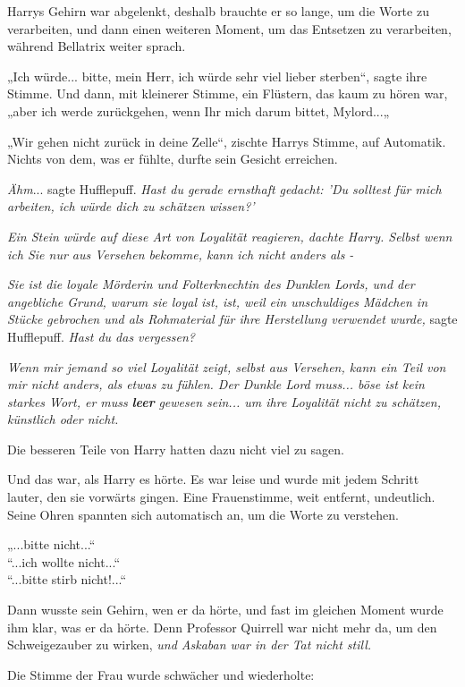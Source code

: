 {Harrys Gehirn war abgelenkt, deshalb brauchte er so lange, um die Worte zu verarbeiten, und dann einen weiteren Moment, um das Entsetzen zu verarbeiten, während Bellatrix weiter sprach.

„Ich würde... bitte, mein Herr, ich würde sehr viel lieber sterben“, sagte ihre Stimme. Und dann, mit kleinerer Stimme, ein Flüstern, das kaum zu hören war,\\ „aber ich werde zurückgehen, wenn Ihr mich darum bittet, Mylord...„

„Wir gehen nicht zurück in deine Zelle“, zischte Harrys Stimme, auf Automatik. Nichts von dem, was er fühlte, durfte sein Gesicht erreichen.

\emph{Ähm}... sagte Hufflepuff. \emph{Hast du gerade ernsthaft gedacht: 'Du solltest für mich arbeiten, ich würde dich zu schätzen wissen?'}

\emph{Ein Stein würde auf diese Art von Loyalität reagieren, dachte Harry. Selbst wenn ich Sie nur aus Versehen bekomme, kann ich nicht anders als -}

\emph{Sie ist die loyale Mörderin und Folterknechtin des Dunklen Lords, und der angebliche Grund, warum sie loyal ist, ist, weil ein unschuldiges Mädchen in Stücke gebrochen und als Rohmaterial für ihre Herstellung verwendet wurde,} sagte Hufflepuff. \emph{Hast du das vergessen?}

\emph{Wenn mir jemand so viel Loyalität zeigt, selbst aus Versehen, kann ein Teil von mir nicht anders, als etwas zu fühlen. Der Dunkle Lord muss... böse ist kein starkes Wort, er muss} \textbf{\emph{leer}} \emph{gewesen sein... um ihre Loyalität nicht zu schätzen, künstlich oder nicht.}

Die besseren Teile von Harry hatten dazu nicht viel zu sagen.

Und das war, als Harry es hörte. Es war leise und wurde mit jedem Schritt lauter, den sie vorwärts gingen. Eine Frauenstimme, weit entfernt, undeutlich. Seine Ohren spannten sich automatisch an, um die Worte zu verstehen.

„...bitte nicht...“\\ “...ich wollte nicht...“\\ “...bitte stirb nicht!...“

Dann wusste sein Gehirn, wen er da hörte, und fast im gleichen Moment wurde ihm klar, was er da hörte. Denn Professor Quirrell war nicht mehr da, um den Schweigezauber zu wirken, \emph{und Askaban war in der Tat nicht still.}

Die Stimme der Frau wurde schwächer und wiederholte:

}
